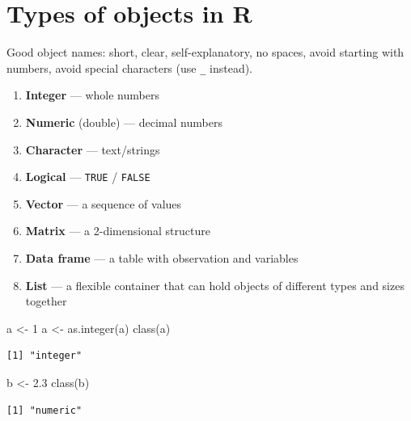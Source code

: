 \documentclass[
  letterpaper,
  DIV=11,
  numbers=noendperiod]{scrartcl}
\newenvironment{Shaded}{\begin{snugshade}}{\end{snugshade}}
\newcommand{\DecValTok}[1]{\textcolor[rgb]{0.68,0.00,0.00}{#1}}
\newcommand{\FloatTok}[1]{\textcolor[rgb]{0.68,0.00,0.00}{#1}}
\newcommand{\FunctionTok}[1]{\textcolor[rgb]{0.28,0.35,0.67}{#1}}
\newcommand{\NormalTok}[1]{\textcolor[rgb]{0.00,0.23,0.31}{#1}}
\newcommand{\OtherTok}[1]{\textcolor[rgb]{0.00,0.23,0.31}{#1}}
\providecommand{\tightlist}{%
  \setlength{\itemsep}{0pt}\setlength{\parskip}{0pt}}
\begin{document}
\section{Types of objects in R}\label{types-of-objects-in-r}

Good object names: short, clear, self-explanatory, no spaces, avoid
starting with numbers, avoid special characters (use \texttt{\_}
instead).

\begin{enumerate}
\def\labelenumi{\arabic{enumi}.}
\tightlist
\item
  \textbf{Integer} --- whole numbers
\item
  \textbf{Numeric} (double) --- decimal numbers
\item
  \textbf{Character} --- text/strings
\item
  \textbf{Logical} --- \texttt{TRUE} / \texttt{FALSE}
\item
  \textbf{Vector} --- a sequence of values\\
\item
  \textbf{Matrix} --- a 2-dimensional structure
\item
  \textbf{Data frame} --- a table with observation and variables
\item
  \textbf{List} --- a flexible container that can hold objects of
  different types and sizes together
\end{enumerate}

\begin{Shaded}
\begin{Highlighting}[]
\NormalTok{a }\OtherTok{\textless{}{-}} \DecValTok{1}
\NormalTok{a }\OtherTok{\textless{}{-}} \FunctionTok{as.integer}\NormalTok{(a)}
\FunctionTok{class}\NormalTok{(a)}
\end{Highlighting}
\end{Shaded}

\begin{verbatim}
[1] "integer"
\end{verbatim}

\begin{Shaded}
\begin{Highlighting}[]
\NormalTok{b }\OtherTok{\textless{}{-}} \FloatTok{2.3}
\FunctionTok{class}\NormalTok{(b)}
\end{Highlighting}
\end{Shaded}

\begin{verbatim}
[1] "numeric"
\end{verbatim}
\end{document}
